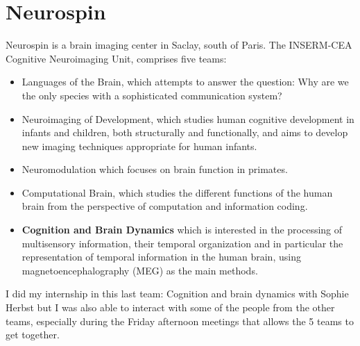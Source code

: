 \section*{Neurospin}

Neurospin is a brain imaging center in Saclay, south of Paris. The INSERM-CEA Cognitive Neuroimaging Unit, comprises five teams:

\begin{itemize}
    \item Languages of the Brain, which attempts to answer the question: Why are we the only species with a sophisticated communication system?
    \item Neuroimaging of Development, which studies human cognitive development in infants and children, both structurally and functionally, and aims to develop new imaging techniques appropriate for human infants.
    \item Neuromodulation which focuses on brain function in primates.
    \item Computational Brain, which studies the different functions of the human brain from the perspective of computation and information coding.
    \item \textbf{Cognition and Brain Dynamics} which is interested in the processing of multisensory information, their temporal organization and in particular the representation of temporal information in the human brain, using magnetoencephalography (MEG) as the main methods.
\end{itemize}

I did my internship in this last team: Cognition and brain dynamics with Sophie Herbst but I was also able to interact with some of the people from the other teams, especially during the Friday afternoon meetings that allows the 5 teams to get together.




